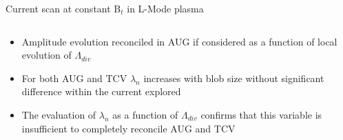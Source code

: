 \documentclass[10pt, compress]{beamer}
\begin{document}
\begin{frame}{Current scan at constant B$_t$ in L-Mode plasma}
\begin{columns}
\begin{column}{0.4\textwidth}
\begin{itemize}
{{            current in agreement with different detachment evolution}}
        \item<only@11> Amplitude evolution reconciled in AUG if
          considered as a function of local evolution of $\Lambda_{div}$
        \item<only@12> For both AUG and TCV $\lambda_n$ increases
          with blob size without significant difference within the
          current explored
        \item<only@13> \alert{The evaluation of $\lambda_n$ as a
          function of $\Lambda_{div}$ confirms that this variable is
          insufficient to completely reconcile AUG and TCV}
      \end{itemize}
    \end{column}
  \end{columns}
\end{frame}  
\end{document}

